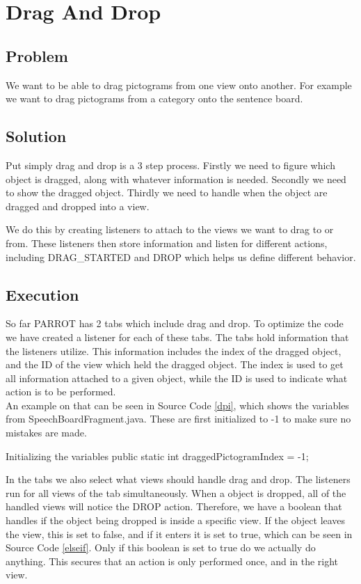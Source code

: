 \section{Drag And Drop} 
\label{dnd}
\subsection*{Problem}
We want to be able to drag pictograms from one view onto another. 
For example we want to drag pictograms from a category onto the sentence board. 

\subsection*{Solution}
Put simply drag and drop is a 3 step process.
Firstly we need to figure which object is dragged, along with whatever information is needed. 
Secondly we need to show the dragged object.
Thirdly we need to handle when the object are dragged and dropped into a view.\newline

We do this by creating listeners to attach to the views we want to drag to or from. 
These listeners then store information and listen for different actions, including DRAG\_STARTED and DROP which helps us define different behavior.

\subsection*{Execution}
So far PARROT has 2 tabs which include drag and drop. To optimize the code we have created a listener for each of these tabs.
The tabs hold information that the listeners utilize. This information includes the index of the dragged object, and the ID of the view which held the dragged object. The index is used to get all information attached to a given object, while the ID is used to indicate what action is to be performed.\\
An example on that can be seen in Source Code \ref{dpi}, which shows the variables from SpeechBoardFragment.java.
These are first initialized to -1 to make sure no mistakes are made.

\begin{source}[{dpi}]{Initializing the variables}
public static int draggedPictogramIndex = -1;
\end{source} 

In the tabs we also select what views should handle drag and drop.
The listeners run for all views of the tab simultaneously. When a object is dropped, all of the handled views will notice the DROP action. Therefore, we have a boolean that handles if the object being dropped is inside a specific view. 
If the object leaves the view, this is set to false, and if it enters it is set to true, which can be seen in Source Code \ref{elseif}. 
Only if this boolean is set to true do we actually do anything. This secures that an action is only performed once, and in the right view. 


